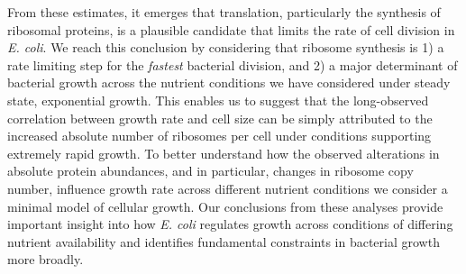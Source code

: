 From these estimates, it emerges that translation, particularly the synthesis of
ribosomal proteins, is a plausible candidate that limits the rate of cell
division in \textit{E. coli}. We reach this conclusion by considering that
ribosome synthesis is 1) a rate limiting step for the \textit{fastest} bacterial
division, and 2) a major determinant of bacterial growth across the nutrient
conditions we have considered under steady state, exponential growth. This
enables us to suggest that the long-observed correlation between growth rate and
cell size \citep{schaechter1958, si2017} can be simply attributed to the
increased absolute number of ribosomes per cell under conditions supporting
extremely rapid growth. To better understand how the observed alterations in
absolute protein abundances, and in particular, changes in ribosome copy number,
influence growth rate across different nutrient conditions we consider a minimal
model of cellular growth. Our conclusions from these analyses provide important
insight into how \textit{E. coli} regulates growth across conditions of
differing nutrient availability and identifies fundamental constraints in
bacterial growth more broadly.

\begin{figure}
\end{figure}
